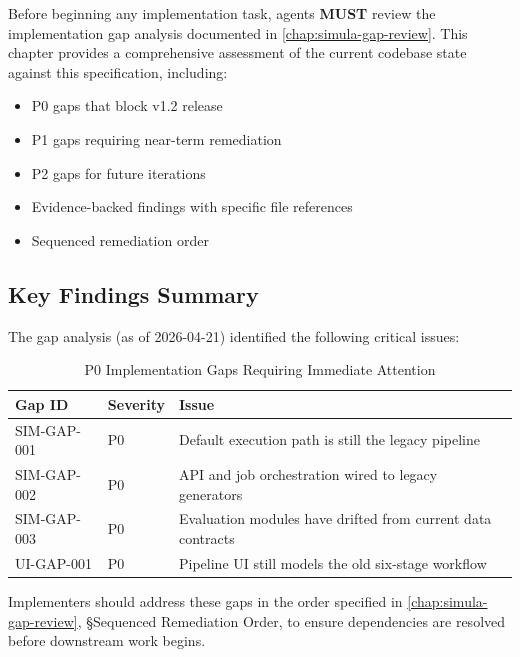 \documentclass[12pt,a4paper,twoside]{report}
\begin{document}
\begin{tcolorbox}[colback=red!5,colframe=red!70,title=\textbf{Critical: Review Gap Analysis Before Implementation}]
Before beginning any implementation task, agents \textbf{MUST} review the implementation
gap analysis documented in \cref{chap:simula-gap-review}. This chapter provides a comprehensive
assessment of the current codebase state against this specification, including:
\begin{itemize}
\item P0 gaps that block v1.2 release
\item P1 gaps requiring near-term remediation
\item P2 gaps for future iterations
\item Evidence-backed findings with specific file references
\item Sequenced remediation order
\end{itemize}
\end{tcolorbox}

\subsection{Key Findings Summary}

The gap analysis (as of 2026-04-21) identified the following critical issues:

\begin{table}[htbp]
\centering
\footnotesize
\caption{P0 Implementation Gaps Requiring Immediate Attention}
\label{tab:p0-gaps-summary}
\begin{tabularx}{\textwidth}{@{}l l X@{}}
\toprule
\textbf{Gap ID} & \textbf{Severity} & \textbf{Issue} \\
\midrule
SIM-GAP-001 & P0 & Default execution path is still the legacy pipeline \\
SIM-GAP-002 & P0 & API and job orchestration wired to legacy generators \\
SIM-GAP-003 & P0 & Evaluation modules have drifted from current data contracts \\
UI-GAP-001 & P0 & Pipeline UI still models the old six-stage workflow \\
\bottomrule
\end{tabularx}
\end{table}

\noindent
Implementers should address these gaps in the order specified in
\cref{chap:simula-gap-review}, \S{}Sequenced Remediation Order, to ensure
dependencies are resolved before downstream work begins.
\end{document}
